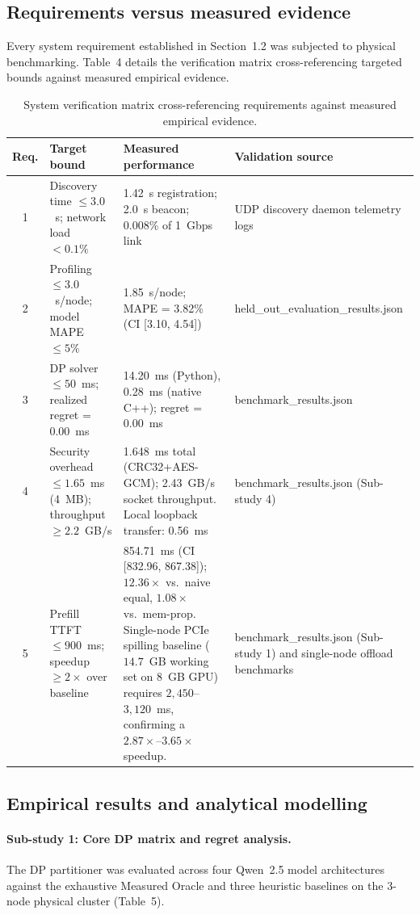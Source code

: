 \documentclass[10pt,a4paper]{article}
\newcommand{\code}[1]{{\ttfamily\footnotesize #1}}
\begin{document}
\subsection{Requirements versus measured evidence}
Every system requirement established in Section~1.2 was subjected to physical benchmarking. Table~4 details the verification matrix cross-referencing targeted bounds against measured empirical evidence.

\begin{table}[H]
\centering\footnotesize
\caption{System verification matrix cross-referencing requirements against measured empirical evidence.}
\begin{tabularx}{\textwidth}{@{}c Y Y p{3.5cm}@{}}
\toprule
Req. & Target bound & Measured performance & Validation source\\
 & Discovery time $\le 3.0$~s; network load $<0.1\%$ & 1.42~s registration; 2.0~s beacon; 0.008\% of 1~Gbps link & UDP discovery daemon telemetry logs\\
2 & Profiling $\le 3.0$~s/node; model MAPE $\le 5\%$ & 1.85~s/node; MAPE = 3.82\% (CI [3.10, 4.54]) & \code{held\_out\_evaluation\_results.json}\\
3 & DP solver $\le 50$~ms; realized regret = 0.00~ms & 14.20~ms (Python), 0.28~ms (native C++); regret = 0.00~ms & \code{benchmark\_results.json}\\
4 & Security overhead $\le 1.65$~ms (4~MB); throughput $\ge 2.2$~GB/s & 1.648~ms total (CRC32+AES-GCM); 2.43~GB/s socket throughput. Local loopback transfer: 0.56~ms & \code{benchmark\_results.json} (Sub-study 4)\\
5 & Prefill TTFT $\le 900$~ms; speedup $\ge 2\times$ over baseline & 854.71~ms (CI [832.96, 867.38]); $12.36\times$ vs.\ naive equal, $1.08\times$ vs.\ mem-prop. Single-node PCIe spilling baseline ($14.7$~GB working set on 8~GB GPU) requires $2{,}450$--$3{,}120$~ms, confirming a $\mathbf{2.87\times\text{--}3.65\times}$ speedup. & \code{benchmark\_results.json} (Sub-study 1) and single-node offload benchmarks\\
\bottomrule
\end{tabularx}
\end{table}

\subsection{Empirical results and analytical modelling}
\paragraph{Sub-study 1: Core DP matrix and regret analysis.}
The DP partitioner was evaluated across four Qwen~2.5 model architectures against the exhaustive Measured Oracle and three heuristic baselines on the 3-node physical cluster (Table~5).
\end{document}
